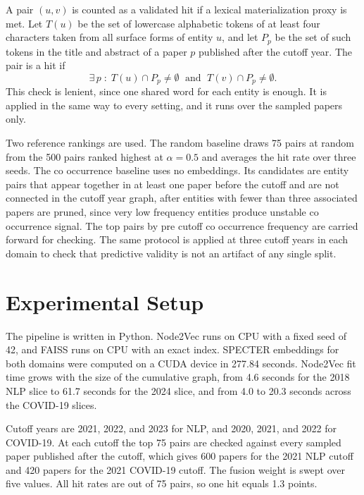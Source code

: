 \documentclass{ieeeaccess}
\begin{document}
A pair $(u, v)$ is counted as a validated hit if a lexical materialization proxy is met. Let $T(u)$ be the set of lowercase alphabetic tokens of at least four characters taken from all surface forms of entity $u$, and let $P_p$ be the set of such tokens in the title and abstract of a paper $p$ published after the cutoff year. The pair is a hit if
\begin{equation}
\exists\, p \;:\; T(u) \cap P_p \neq \emptyset \;\text{ and }\; T(v) \cap P_p \neq \emptyset.
\label{eq:hit}
\end{equation}
This check is lenient, since one shared word for each entity is enough. It is applied in the same way to every setting, and it runs over the sampled papers only.

Two reference rankings are used. The random baseline draws 75 pairs at random from the 500 pairs ranked highest at $\alpha = 0.5$ and averages the hit rate over three seeds. The co occurrence baseline uses no embeddings. Its candidates are entity pairs that appear together in at least one paper before the cutoff and are not connected in the cutoff year graph, after entities with fewer than three associated papers are pruned, since very low frequency entities produce unstable co occurrence signal. The top pairs by pre cutoff co occurrence frequency are carried forward for checking. The same protocol is applied at three cutoff years in each domain to check that predictive validity is not an artifact of any single split.

\section{Experimental Setup}
\label{sec:setup}

The pipeline is written in Python. Node2Vec runs on CPU with a fixed seed of 42, and FAISS runs on CPU with an exact index. SPECTER embeddings for both domains were computed on a CUDA device in 277.84 seconds. Node2Vec fit time grows with the size of the cumulative graph, from 4.6 seconds for the 2018 NLP slice to 61.7 seconds for the 2024 slice, and from 4.0 to 20.3 seconds across the COVID-19 slices.

Cutoff years are 2021, 2022, and 2023 for NLP, and 2020, 2021, and 2022 for COVID-19. At each cutoff the top 75 pairs are checked against every sampled paper published after the cutoff, which gives 600 papers for the 2021 NLP cutoff and 420 papers for the 2021 COVID-19 cutoff. The fusion weight is swept over five values. All hit rates are out of 75 pairs, so one hit equals 1.3 points.
\end{document}
